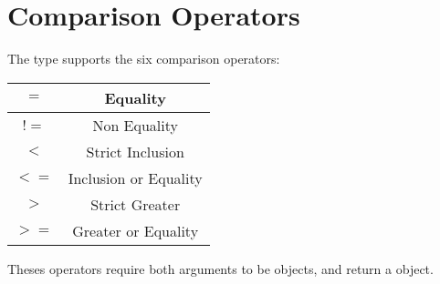 \section{Comparison Operators}

The  type supports the six comparison operators:\newline

\begin{tabular}{|c|c|}
\hline
$=$ & Equality \\
\hline
$!=$ & Non Equality \\
\hline
$<$  & Strict Inclusion \\
\hline
$<=$  & Inclusion or Equality \\
\hline
$>$  & Strict Greater \\
\hline
$>=$  & Greater or Equality \\
\hline
\end{tabular}

Theses operators require both arguments to be  objects, and return a  object.


